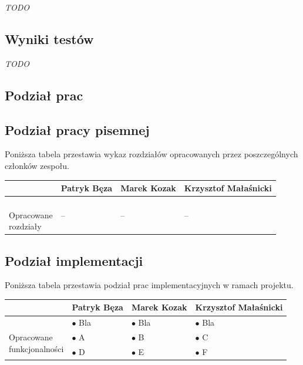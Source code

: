 \documentclass[a4paper,titlepage]{article}
\theoremstyle{break}
\begin{document}
\emph{TODO}


\subsection{Wyniki testów}

\emph{TODO}


\newpage

\begin{appendices}

\section{Podział prac}
\subsection{Podział pracy pisemnej}

Poniższa tabela przestawia wykaz rozdziałów opracowanych przez poszczególnych członków zespołu.

\begin{table}[H]
\center
\begin{tabular}{p{2.5cm}|p{3.3cm}|p{3.3cm}|p{3.3cm}}
& Patryk Bęza & Marek Kozak & Krzysztof Małaśnicki \\\hline\hline
\parbox{3cm}{\ \\Opracowane \\rozdziały} & -- & -- & --\\
\end{tabular}
\end{table}

\subsection{Podział implementacji}

Poniższa tabela przestawia podział prac implementacyjnych w ramach projektu.

\begin{table}[H]
\center
\begin{tabular}{p{2.5cm}|p{3.3cm}|p{3.3cm}|p{3.3cm}}
& Patryk Bęza & Marek Kozak & Krzysztof Małaśnicki \\\hline\hline
\multirow{3}{*}{\parbox{3cm}{\ \\Opracowane \\funkcjonalności}} & $\bullet$ Bla & $\bullet$ Bla & $\bullet$ Bla\\
& $\bullet$ A & $\bullet$ B & $\bullet$ C \\
& $\bullet$ D & $\bullet$ E & $\bullet$ F \\
\end{tabular}
\end{table}

\end{appendices}


\end{document}
